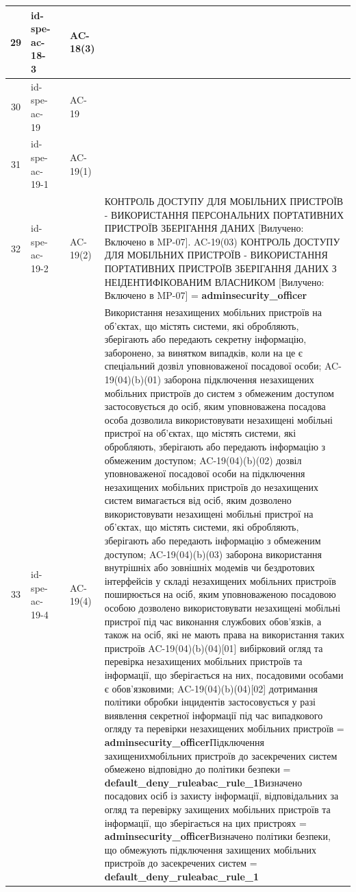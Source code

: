 \documentclass[10pt]{article}
\begin{document}
\begin{longtable}{|c|>{\raggedright\arraybackslash}p{2.5cm}|>{\raggedright\arraybackslash}p{4.5cm}|>{\raggedright\arraybackslash}p{3cm}|>{\raggedright\arraybackslash}p{4.5cm}|}
29 & id-spe-ac-18-3 &  & AC-18(3) &  \\ \hline
30 & id-spe-ac-19 &  & AC-19 &  \\ \hline
31 & id-spe-ac-19-1 &  & AC-19(1) &  \\ \hline
32 & id-spe-ac-19-2 &  & AC-19(2) & КОНТРОЛЬ ДОСТУПУ ДЛЯ МОБІЛЬНИХ ПРИСТРОЇВ - ВИКОРИСТАННЯ ПЕРСОНАЛЬНИХ ПОРТАТИВНИХ ПРИСТРОЇВ ЗБЕРІГАННЯ ДАНИХ [Вилучено: Включено в MP-07]. AC-19(03) КОНТРОЛЬ ДОСТУПУ ДЛЯ МОБІЛЬНИХ ПРИСТРОЇВ - ВИКОРИСТАННЯ ПОРТАТИВНИХ ПРИСТРОЇВ ЗБЕРІГАННЯ ДАНИХ З НЕІДЕНТИФІКОВАНИМ ВЛАСНИКОМ [Вилучено: Включено в MP-07] = \textbf{adminsecurity\_\allowbreak{}officer} \\ \hline
33 & id-spe-ac-19-4 &  & AC-19(4) & Використання незахищених мобільних пристроїв на об'єктах, що містять системи, які обробляють, зберігають або передають секретну інформацію, заборонено, за винятком випадків, коли на це є спеціальний дозвіл уповноваженої посадової особи; AC-19(04)(b)(01) заборона підключення незахищених мобільних пристроїв до систем з обмеженим доступом застосовується до осіб, яким уповноважена посадова особа дозволила використовувати незахищені мобільні пристрої на об'єктах, що містять системи, які обробляють, зберігають або передають інформацію з обмеженим доступом; AC-19(04)(b)(02) дозвіл уповноваженої посадової особи на підключення незахищених мобільних пристроїв до незахищених систем вимагається від осіб, яким дозволено використовувати незахищені мобільні пристрої на об'єктах, що містять системи, які обробляють, зберігають або передають інформацію з обмеженим доступом; AC-19(04)(b)(03) заборона використання внутрішніх або зовнішніх модемів чи бездротових інтерфейсів у складі незахищених мобільних пристроїв поширюється на осіб, яким уповноваженою посадовою особою дозволено використовувати незахищені мобільні пристрої під час виконання службових обов'язків, а також на осіб, які не мають права на використання таких пристроїв AC-19(04)(b)(04)[01] вибірковий огляд та перевірка незахищених мобільних пристроїв та інформації, що зберігається на них, посадовими особами є обов'язковими; AC-19(04)(b)(04)[02] дотримання політики обробки інцидентів застосовується у разі виявлення секретної інформації під час випадкового огляду та перевірки незахищених мобільних пристроїв = \textbf{adminsecurity\_\allowbreak{}officer}\newline Підключення захищенихмобільних пристроїв до засекречених систем обмежено відповідно до політики безпеки = \textbf{default\_\allowbreak{}deny\_\allowbreak{}ruleabac\_\allowbreak{}rule\_\allowbreak{}1}\newline Визначено посадових осіб із захисту інформації, відповідальних за огляд та перевірку захищених мобільних пристроїв та інформації, що зберігається на цих пристроях = \textbf{adminsecurity\_\allowbreak{}officer}\newline Визначено політики безпеки, що обмежують підключення захищених мобільних пристроїв до засекречених систем = \textbf{default\_\allowbreak{}deny\_\allowbreak{}ruleabac\_\allowbreak{}rule\_\allowbreak{}1} \\ \hline

\end{longtable}
\end{document}
